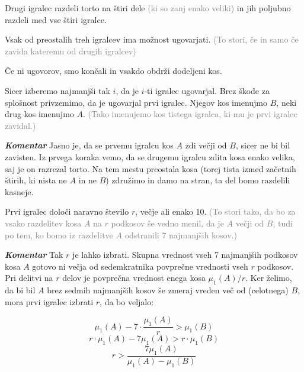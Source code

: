 \documentclass[a4paper,12pt]{article}
\begin{document}
\begin{protokol}

\item Drugi igralec razdeli torto na štiri dele \textcolor{gray}{(ki so zanj enako veliki)} in jih poljubno razdeli med vse štiri igralce.

\item Vsak od preostalih treh igralcev ima možnost ugovarjati. \textcolor{gray}{(To stori, če in samo če zavida kateremu od drugih igralcev)}

\item Če ni ugovorov, smo končali in vsakdo obdrži dodeljeni kos.

\item Sicer izberemo najmanjši tak $i$, da je $i$-ti igralec ugovarjal. Brez škode za splošnost privzemimo, da je ugovarjal prvi igralec. Njegov kos imenujmo $B$, neki drug kos imenujmo $A$. \textcolor{gray}{(Tako imenujemo kos tistega igralca, ki mu je prvi igralec zavidal.)} %

\item [\textbf{\em Komentar}] Jasno je, da se prvemu igralcu kos $A$ zdi večji od $B$, sicer ne bi bil zavisten. Iz prvega koraka vemo, da se drugemu igralcu zdita kosa enako velika, saj je on razrezal torto. Na tem mestu preostala kosa (torej tista izmed začetnih štirih, ki nista ne $A$ in ne $B$) združimo in damo na stran, ta del bomo razdelili kasneje.




\item Prvi igralec določi naravno število $r$, večje ali enako 10. \textcolor{gray}{(To stori tako, da bo za vsako razdelitev kosa $A$ na $r$ podkosov še vedno menil, da je $A$ večji od $B$, tudi po tem, ko bomo iz razdelitve $A$ odstranili 7 najmanjših kosov.)} %

\item [\textbf{\em Komentar}] Tak $r$ je lahko izbrati. Skupna vrednost vseh 7 najmanjših podkosov kosa $A$ gotovo ni večja od sedemkratnika povprečne vrednosti vseh $r$ podkosov. Pri delitvi na $r$ delov je povprečna vrednost enega kosa $\mu_1(A)/r$. Ker želimo, da bi bil $A$ brez sedmih najmanjših kosov še zmeraj vreden več od (celotnega) $B$, mora prvi igralec izbrati $r$, da bo veljalo:

$$ \mu_1(A) - 7 \cdot \frac{\mu_1(A)}{r} > \mu_1(B) $$
$$r \cdot \mu_1(A) - 7 \mu_1(A) > r \cdot \mu_1(B) $$
$$r > \frac{7 \mu_1(A)}{\mu_1(A) - \mu_1(B)} $$



\end{protokol}
\end{document}
